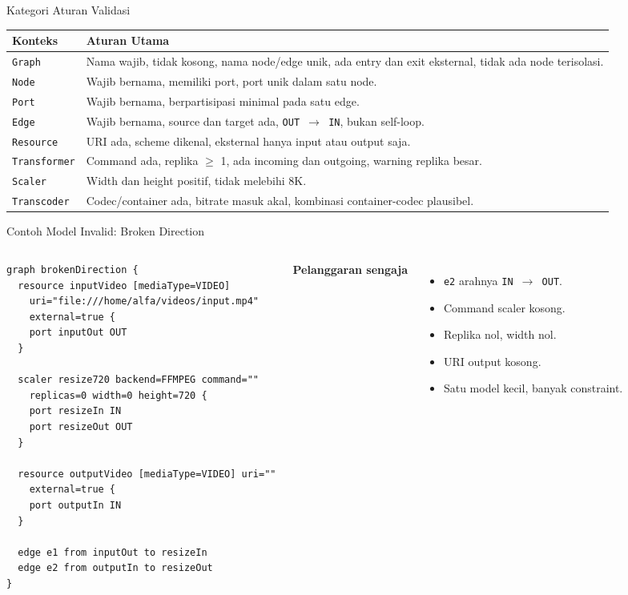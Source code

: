 \documentclass[aspectratio=169, table]{beamer}
\begin{document}
\begin{frame}{Kategori Aturan Validasi}
\vspace{2pt}
\scriptsize
\begin{tabular}{|p{}|p{}|}
\hline
\rowcolor{black!8}
\textbf{Konteks} & \textbf{Aturan Utama} \\
\hline
\texttt{Graph} & Nama wajib, tidak kosong, nama node/edge unik, ada entry dan exit eksternal, tidak ada node terisolasi. \\
\hline
\texttt{Node} & Wajib bernama, memiliki port, port unik dalam satu node. \\
\hline
\texttt{Port} & Wajib bernama, berpartisipasi minimal pada satu edge. \\
\hline
\texttt{Edge} & Wajib bernama, source dan target ada, \texttt{OUT $\rightarrow$ IN}, bukan self-loop. \\
\hline
\texttt{Resource} & URI ada, scheme dikenal, eksternal hanya input atau output saja. \\
\hline
\texttt{Transformer} & Command ada, replika $\geq$ 1, ada incoming dan outgoing, warning replika besar. \\
\hline
\texttt{Scaler} & Width dan height positif, tidak melebihi 8K. \\
\hline
\texttt{Transcoder} & Codec/container ada, bitrate masuk akal, kombinasi container-codec plausibel. \\
\hline
\end{tabular}
\end{frame}

\begin{frame}[fragile]{Contoh Model Invalid: Broken Direction}
\vspace{2pt}
\begin{columns}[T,onlytextwidth]
\begin{lstlisting}[language=mediaflow, basicstyle=\ttfamily\tiny]
graph brokenDirection {
  resource inputVideo [mediaType=VIDEO]
    uri="file:///home/alfa/videos/input.mp4"
    external=true {
    port inputOut OUT
  }

  scaler resize720 backend=FFMPEG command=""
    replicas=0 width=0 height=720 {
    port resizeIn IN
    port resizeOut OUT
  }

  resource outputVideo [mediaType=VIDEO] uri=""
    external=true {
    port outputIn IN
  }

  edge e1 from inputOut to resizeIn
  edge e2 from outputIn to resizeOut
}
\end{lstlisting}

\scriptsize
\textbf{Pelanggaran sengaja}
\begin{itemize}
  \item \texttt{e2} arahnya \texttt{IN $\rightarrow$ OUT}.
  \item Command scaler kosong.
  \item Replika nol, width nol.
  \item URI output kosong.
  \item Satu model kecil, banyak constraint.
\end{itemize}
\end{columns}
\end{frame}
\end{document}
